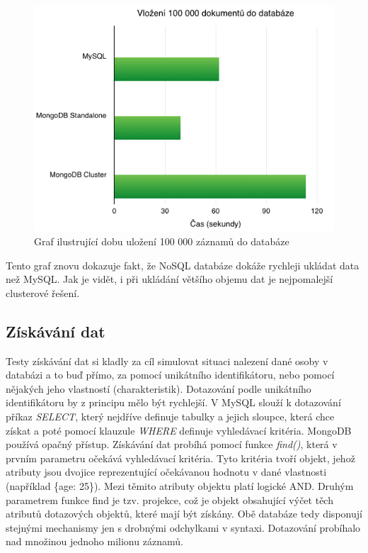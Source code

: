 \begin{figure}[h]
\begin{centering}
\includegraphics[scale=0.5]{obrazky/grafy/insert100k}
\par\end{centering}
\caption{Graf ilustrující dobu uložení 100 000 záznamů do databáze}
\end{figure}

Tento graf znovu dokazuje fakt, že NoSQL databáze dokáže rychleji ukládat data než MySQL. Jak je vidět, i při ukládání většího objemu dat je nejpomalejší clusterové řešení.
\subsection{Získávání dat}
Testy získávání dat si kladly za cíl simulovat situaci nalezení dané osoby v databázi a to buď přímo, za pomocí unikátního identifikátoru, nebo pomocí nějakých jeho vlastností (charakteristik). Dotazování podle unikátního identifikátoru by z principu mělo být rychlejší. V MySQL slouží k dotazování příkaz \emph{SELECT}, který nejdříve definuje tabulky a jejich sloupce, která chce získat a poté pomocí klauzule \emph{WHERE} definuje vyhledávací kritéria. MongoDB používá opačný přístup. Získávání dat probíhá pomocí funkce \emph{find()}, která v prvním parametru očekává vyhledávací kritéria. Tyto kritéria tvoří objekt, jehož atributy jsou dvojice reprezentující očekávanou hodnotu v dané vlastnosti (například \{age: 25\}). Mezi těmito atributy objektu platí logické AND. Druhým parametrem funkce find je tzv. projekce, což je objekt obsahující výčet těch atributů dotazových objektů, které mají být získány. Obě databáze tedy disponují stejnými mechanismy jen s drobnými odchylkami v syntaxi. Dotazování probíhalo nad množinou jednoho milionu záznamů.

